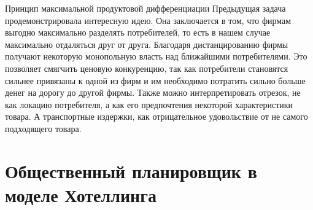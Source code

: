 \begin{mybox}{Принцип максимальной продуктовой дифференциации}
    \indent\setlength{\parindent}{1em}\indent\setlength{\parindent}{1em}Предыдущая задача продемонстрировала интересную идею. Она заключается в том, что фирмам выгодно максимально
    разделять потребителей, то есть в нашем случае максимально отдаляться друг от друга. Благодаря дистанцированию
    фирмы получают некоторую монопольную власть над ближайшими потребителями. Это позволяет смягчить ценовую
    конкуренцию, так как потребители становятся сильнее привязаны к одной из фирм и им необходимо потратить сильно
    больше денег на дорогу до другой фирмы. Также можно интерпретировать отрезок, не как локацию потребителя, а как
    его предпочтения некоторой характеристики товара. А транспортные издержки, как отрицательное удовольствие от не
    самого подходящего товара.
\end{mybox}


\section{Общественный планировщик в моделе Хотеллинга}


